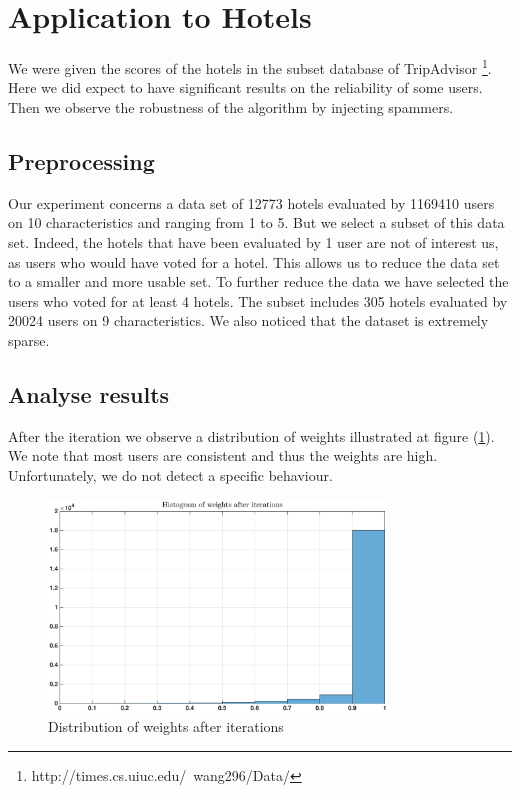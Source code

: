 \documentclass[12pt,a4paper]{article}
\begin{document}
\section{Application to Hotels}

We were given the scores of the hotels in the subset database of TripAdvisor \footnote{http://times.cs.uiuc.edu/~wang296/Data/}. Here we did  expect to have significant results on the reliability of some users. Then we observe the robustness of the algorithm by injecting spammers.

\subsection{Preprocessing}
Our experiment concerns a data set of 12773 hotels evaluated by 1169410 users on 10 characteristics and ranging from 1 to 5. But we select a subset of this data set. Indeed, the hotels that have been evaluated by 1 user are not of interest us, as users who would have voted for a hotel. This allows us to reduce the data set to a smaller and more usable set. To further reduce the data we have selected the users who voted for at least 4 hotels. The subset includes 305 hotels evaluated by 20024 users on 9 characteristics. We also noticed that the dataset is extremely sparse.

\subsection{Analyse results} 

After the iteration we observe a distribution of weights illustrated at figure (\ref{fig:hotel:initial_weights}). We note that most users are consistent and thus the weights are high. Unfortunately, we do not detect a specific behaviour.

\begin{figure}[!h]
\centering
\includegraphics[width = 0.8\textwidth]{hotels/initial_weights.eps}
\caption{\label{fig:hotel:initial_weights} Distribution of weights after iterations}
\end{figure}
\end{document}
